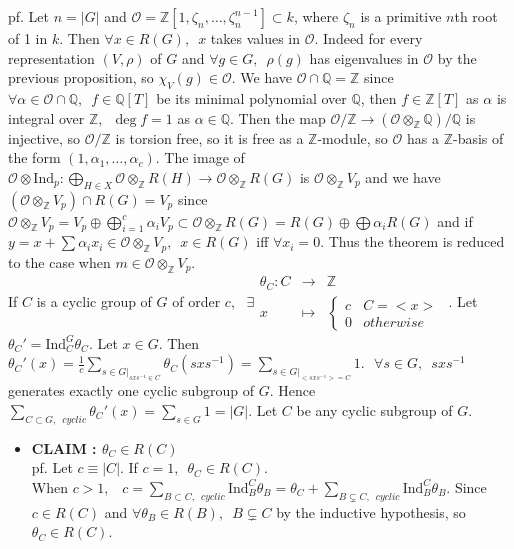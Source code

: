 \documentclass[12pt,letterpaper]{report}
\begin{document}
pf. Let $n=|G|$ and $\mathcal{O}=\mathbb{Z}[1,\zeta_{n},\dots,\zeta_{n}^{n-1}]\subset k$, where $\zeta_{n}$ is a primitive $n$th root of 1 in $k$. Then $\forall x\in R(G),\,\,\,x$ takes values in $\mathcal{O}$. Indeed for every representation $(V,\rho)$ of $G$ and $\forall g\in G,\,\,\,\rho(g)$ has eigenvalues in $\mathcal{O}$ by the previous proposition, so $\chi_{V}(g)\in\mathcal{O}$. We have $\mathcal{O}\cap\mathbb{Q}=\mathbb{Z}$ since $\forall \alpha\in \mathcal{O}\cap\mathbb{Q},\,\,\,f\in\mathbb{Q}[T]$ be its minimal polynomial over $\mathbb{Q}$, then $f\in\mathbb{Z}[T]$ as $\alpha$ is integral over $\mathbb{Z},\,\,\,\deg f=1$ as $\alpha\in\mathbb{Q}$. Then the map $\mathcal{O}/\mathbb{Z}\rightarrow(\mathcal{O}\otimes_{\mathbb{Z}}\mathbb{Q})/\mathbb{Q}$ is injective, so $\mathcal{O}/\mathbb{Z}$ is torsion free, so it is free as a $\mathbb{Z}$-module, so $\mathcal{O}$ has a $\mathbb{Z}$-basis of the form $(1,\alpha_{1},\dots,\alpha_{c})$. The image of $\mathcal{O}\otimes\text{Ind}_{p}:\bigoplus_{H\in X}\mathcal{O}\otimes_{\mathbb{Z}}R(H)\rightarrow\mathcal{O}\otimes_{\mathbb{Z}}R(G)$ is $\mathcal{O}\otimes_{\mathbb{Z}}V_{p}$ and we have $(\mathcal{O}\otimes_{\mathbb{Z}}V_{p})\cap R(G)=V_{p}$ since $\mathcal{O}\otimes_{\mathbb{Z}}V_{p}=V_{p}\oplus\bigoplus_{i=1}^{c}\alpha_{i}V_{p}\subset\mathcal{O}\otimes_{\mathbb{Z}}R(G)=R(G)\oplus\bigoplus\alpha_{i}R(G)$ and if $y=x+\sum\alpha_{i}x_{i}\in\mathcal{O}\otimes_{\mathbb{Z}}V_{p},\,\,\,x\in R(G)$ iff $\forall x_{i}=0$. Thus the theorem is reduced to the case when $m\in\mathcal{O}\otimes_{\mathbb{Z}}V_{p}$. 
\\If $C$ is a cyclic group of $G$ of order $c,\,\,\,\,\exists\begin{array}{rrr}\theta_{C}:C&\rightarrow&\mathbb{Z}\\x&\mapsto&\left\{\begin{array}{rr}c&C=<x>\\0&otherwise\end{array}\right.\end{array}$. Let $\theta_{C}'=\text{Ind}_{C}^{G}\theta_{C}$. Let $x\in G$. Then $\theta_{C}'(x)=\frac{1}{c}\sum_{s\in G|_{sxs^{-1}\in C}}\theta_{C}(sxs^{-1})=\sum_{s\in G|_{<sxs^{-1}>=C}}1.\,\,\,\,\forall s\in G,\,\,\,sxs^{-1}$ generates exactly one cyclic subgroup of $G$. Hence $\sum_{C\subset G,\,\,\,cyclic}\theta_{C}'(x)=\sum_{s\in G}1=|G|$. Let $C$ be any cyclic subgroup of $G$. 
\begin{itemize}\item \textbf{CLAIM : $\theta_{C}\in R(C)$}
\\pf. Let $c\equiv|C|$. If $c=1,\,\,\,\theta_{C}\in R(C)$. 
\\When $c>1,\,\,\,\,\,c=\sum_{B\subset C,\,\,\,cyclic}\text{Ind}_{B}^{C}\theta_{B}=\theta_{C}+\sum_{B\subsetneq C,\,\,\,cyclic}\text{Ind}_{B}^{C}\theta_{B}$. Since $c\in R(C)$ and $\forall \theta_{B}\in R(B),\,\,\,B\subsetneq C$ by the inductive hypothesis, so $\theta_{C}\in R(C)$. 
\end{itemize}
\end{document}
